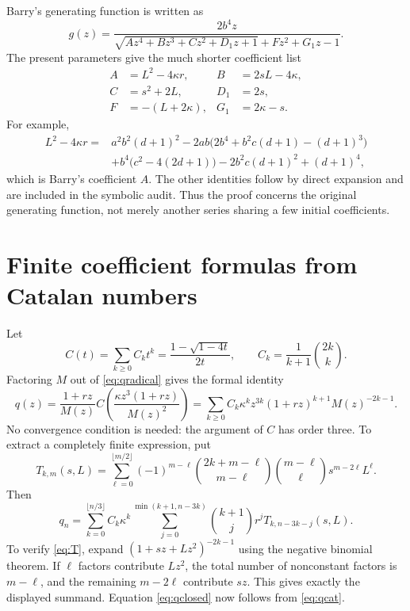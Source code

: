 \documentclass[11pt,letterpaper]{article}
\numberwithin{equation}{section}
\theoremstyle{definition}
\theoremstyle{remark}
\begin{document}
Barry's generating function is written as
\[
 g(z)=\frac{2b^4z}{\sqrt{Az^4+Bz^3+Cz^2+D_1z+1}+Fz^2+G_1z-1}.
\]
The present parameters give the much shorter coefficient list
\begin{align}
 A&=L^2-4\kappa r,& B&=2sL-4\kappa,\label{eq:AB}\\
 C&=s^2+2L,&D_1&=2s,\label{eq:CD}\\
 F&=-(L+2\kappa),&G_1&=2\kappa-s.\label{eq:FG}
\end{align}
For example,
\begin{align*}
 L^2-4\kappa r
 ={}&a^2b^2(d+1)^2
 -2ab\bigl(2b^4+b^2c(d+1)-(d+1)^3\bigr)\\
 &+b^4\bigl(c^2-4(2d+1)\bigr)
 -2b^2c(d+1)^2+(d+1)^4,
\end{align*}
which is Barry's coefficient $A$. The other identities follow by direct
expansion and are included in the symbolic audit. Thus the proof concerns
the original generating function, not merely another series sharing a
few initial coefficients.

\section{Finite coefficient formulas from Catalan numbers}\label{app:coefficients}

Let
\[
 C(t)=\sum_{k\ge0}C_kt^k=\frac{1-\sqrt{1-4t}}{2t},\qquad
 C_k=\frac1{k+1}\binom{2k}{k}.
\]
Factoring $M$ out of \eqref{eq:qradical} gives the formal identity
\begin{equation}\label{eq:qcat}
 q(z)=\frac{1+rz}{M(z)}
 C\!\left(\frac{\kappa z^3(1+rz)}{M(z)^2}\right)
 =\sum_{k\ge0}C_k\kappa^kz^{3k}
   (1+rz)^{k+1}M(z)^{-2k-1}.
\end{equation}
No convergence condition is needed: the argument of $C$ has order three.
To extract a completely finite expression, put
\begin{equation}\label{eq:T}
 T_{k,m}(s,L)=
 \sum_{\ell=0}^{\lfloor m/2\rfloor}
 (-1)^{m-\ell}
 \binom{2k+m-\ell}{m-\ell}
 \binom{m-\ell}{\ell}s^{m-2\ell}L^\ell.
\end{equation}
Then
\begin{equation}\label{eq:qclosed}
 q_n=\sum_{k=0}^{\lfloor n/3\rfloor}C_k\kappa^k
 \sum_{j=0}^{\min(k+1,n-3k)}
 \binom{k+1}{j}r^j T_{k,n-3k-j}(s,L).
\end{equation}
To verify \eqref{eq:T}, expand $(1+sz+Lz^2)^{-2k-1}$ using the negative
binomial theorem. If $\ell$ factors contribute $Lz^2$, the total number
of nonconstant factors is $m-\ell$, and the remaining $m-2\ell$
contribute $sz$. This gives exactly the displayed summand. Equation
\eqref{eq:qclosed} now follows from \eqref{eq:qcat}.
\end{document}

